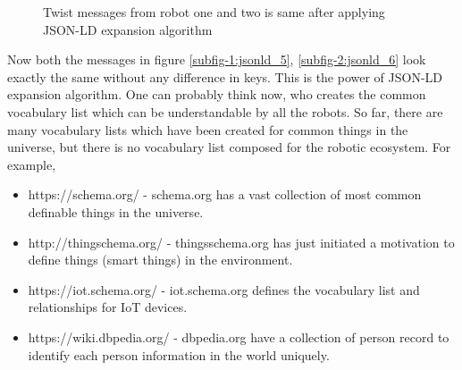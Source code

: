 	
		\begin{figure}[!htbp]
		\hfill
		\caption{Twist messages from robot one and two is same after applying JSON-LD expansion algorithm}
		\label{fig:dummy}
	\end{figure}
	Now both the messages in figure \ref{subfig-1:jsonld_5}, \ref{subfig-2:jsonld_6} look exactly the same without any difference in keys. This is the power of JSON-LD expansion algorithm. One can probably think now, who creates the common vocabulary list which can be understandable by all the robots. So far, there are many vocabulary lists which have been created for common things in the universe, but there is no vocabulary list composed for the robotic ecosystem.  For example,
	
	\begin{itemize}
		\item https://schema.org/ - schema.org has a vast collection of most common definable things in the universe.
		\item http://thingschema.org/ - thingsschema.org has just initiated a motivation to define things (smart things) in the environment.
		\item https://iot.schema.org/ - iot.schema.org defines the vocabulary list and relationships for IoT devices.
		\item https://wiki.dbpedia.org/ - dbpedia.org have a collection of person record to identify each person information in the world uniquely.
	\end{itemize}

